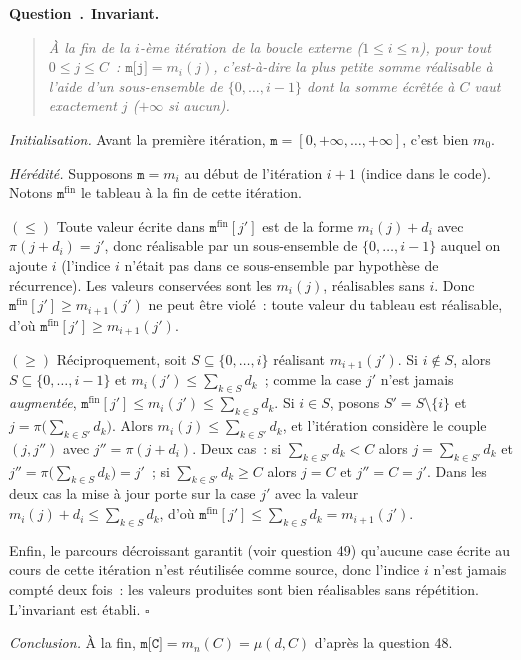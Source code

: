 \documentclass[11pt,a4paper]{article}
\renewcommand{\Q}{\medskip\par\stepcounter{qcnt}\noindent\textbf{\color{cnc}Question~\theqcnt.}~}
\begin{document}
\Q \textbf{Invariant.}
\begin{quote}\itshape
À la fin de la $i$-ème itération de la boucle externe ($1\le i\le n$), pour tout
$0\le j\le C$~: $\texttt{m[j]} = m_i(j)$, c'est-à-dire la plus petite somme réalisable à
l'aide d'un sous-ensemble de $\{0,\dots,i-1\}$ dont la somme écrêtée à $C$ vaut exactement
$j$ ($+\infty$ si aucun).
\end{quote}
\emph{Initialisation.} Avant la première itération, $\texttt{m}=[0,+\infty,\dots,+\infty]$,
c'est bien $m_0$.

\emph{Hérédité.} Supposons $\texttt{m}=m_i$ au début de l'itération $i+1$ (indice 
dans le code). Notons $\texttt{m}^{\text{fin}}$ le tableau à la fin de cette itération.

$(\le)$ Toute valeur écrite dans $\texttt{m}^{\text{fin}}[j']$ est de la forme
$m_i(j)+d_i$ avec $\pi(j+d_i)=j'$, donc réalisable par un sous-ensemble de
$\{0,\dots,i-1\}$ auquel on ajoute $i$ (l'indice $i$ n'était pas dans ce sous-ensemble par
hypothèse de récurrence). Les valeurs conservées sont les $m_i(j)$, réalisables sans $i$.
Donc $\texttt{m}^{\text{fin}}[j']\ge m_{i+1}(j')$ ne peut être violé~: toute valeur du tableau
est réalisable, d'où $\texttt{m}^{\text{fin}}[j']\ge m_{i+1}(j')$.

$(\ge)$ Réciproquement, soit $S\subseteq\{0,\dots,i\}$ réalisant $m_{i+1}(j')$. Si $i\notin
S$, alors $S\subseteq\{0,\dots,i-1\}$ et $m_i(j')\le\sum_{k\in S}d_k$~; comme la case $j'$
n'est jamais \emph{augmentée}, $\texttt{m}^{\text{fin}}[j']\le m_i(j')\le\sum_{k\in S}d_k$.
Si $i\in S$, posons $S'=S\setminus\{i\}$ et $j=\pi\big(\sum_{k\in S'}d_k\big)$. Alors
$m_i(j)\le\sum_{k\in S'}d_k$, et l'itération considère le couple $(j,j'')$ avec
$j''=\pi(j+d_i)$. Deux cas~: si $\sum_{k\in S'}d_k<C$ alors $j=\sum_{k\in S'}d_k$ et
$j''=\pi\big(\sum_{k\in S}d_k\big)=j'$~; si $\sum_{k\in S'}d_k\ge C$ alors $j=C$ et
$j''=C=j'$. Dans les deux cas la mise à jour porte sur la case $j'$ avec la valeur
$m_i(j)+d_i\le \sum_{k\in S}d_k$, d'où $\texttt{m}^{\text{fin}}[j']\le\sum_{k\in S}d_k =
m_{i+1}(j')$.

Enfin, le parcours décroissant garantit (voir question 49) qu'aucune case écrite au cours de
cette itération n'est réutilisée comme source, donc l'indice $i$ n'est jamais compté deux
fois~: les valeurs produites sont bien réalisables sans répétition. L'invariant est établi.
\hfill$\square$

\emph{Conclusion.} À la fin, $\texttt{m[C]}=m_n(C)=\mu(d,C)$ d'après la question 48.
\end{document}
